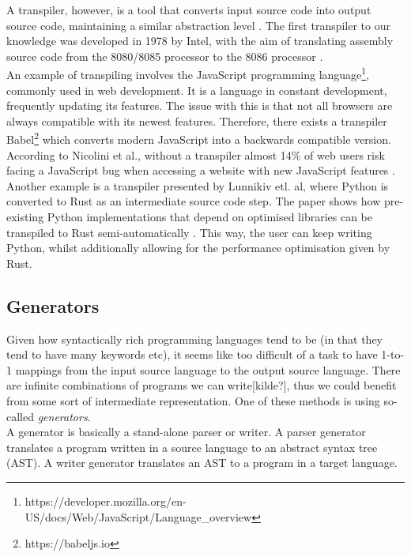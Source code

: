 A transpiler, however, is a tool that converts input source code into output source code, maintaining a similar abstraction level \cite{DBLP:conf/els/MarcelinoL22}. The first transpiler to our knowledge was developed in 1978 by Intel, with the aim of translating assembly source code from the 8080/8085 processor to the 8086 processor \cite{intel1979}. \hfill \\

An example of transpiling involves the JavaScript programming language\footnote{https://developer.mozilla.org/en-US/docs/Web/JavaScript/Language\_overview}, commonly used in web development. It is a language in constant development, frequently updating its features. The issue with this is that not all browsers are always compatible with its newest features. Therefore, there exists a transpiler Babel\footnote{https://babeljs.io} which converts modern JavaScript into a backwards compatible version. According to Nicolini et al., without a transpiler almost 14\% of web users risk facing a JavaScript bug when accessing a website with new JavaScript features \cite{DBLP:journals/software/NicoliniHF24}. \hfill \\

Another example is a transpiler presented by Lunnikiv etl. al, where Python is converted to Rust as an intermediate source code step. The paper shows how pre-existing Python implementations that depend on optimised libraries can be transpiled to Rust semi-automatically \cite{DBLP:conf/samos/LunnikiviJ020}. This way, the user can keep writing Python, whilst additionally allowing for the performance optimisation given by Rust.

\subsection{Generators}

Given how syntactically rich programming languages tend to be (in that they tend to have many keywords etc), it seems like too difficult of a task to have 1-to-1 mappings from the input source language to the output source language. There are infinite combinations of programs we can write[kilde?], thus we could benefit from some sort of intermediate representation. One of these methods is using so-called \textit{generators}. \hfill \\

A generator is basically a stand-alone parser or writer. A parser generator translates a program written in a source language to an abstract syntax tree (AST). A writer generator translates an AST to a program in a target language. \hfill \\

